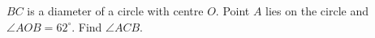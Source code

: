 $BC$ is a diameter of a circle with centre $O$. Point $A$ lies on the circle and $\angle AOB=62^\circ$. Find $\angle ACB$.
